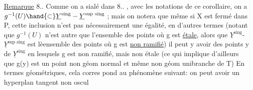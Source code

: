\uline{Remarque} 8..  Comme on a sialé dans  8.. , avec les notations de
ce corollaire, on a  $g^{-1}(U) \hand{\subset} \underline{Y}^{\text{sing}} - \underline{Y}^{\text{sup sing}}$ ; mais on notera que
même si X est fermé dans P,  cette inclusion n'est pas nécessairement
\margin{\hand{\unsure{$\cdot$}}} une égalité, en d'autres termes (notant que $g^{-1}(U)$ n'est autre que
l'ensemble des points où g est \uline{étale}, alors que $\underline{Y}^{\text{sing}}$-$\underline{Y}^{\text{sup sing}}$ est
lèensemble des points où g est \uline{non ramifié}) il peut y avoir des points
y de $\underline{Y}^{\text{sing}}$ en lesquels  g est  non ramifié, mais non étale (ce qui
 implique d'ailleurs que g(y) est un point non  géom normal et même
non géom unibranche de  T)  En termes géométriques, cela corres%
pond au phénomène suivant: on peut avoir un hyperplan tangent non oscul
